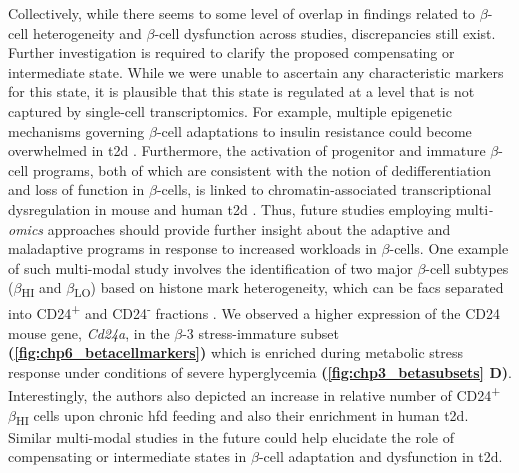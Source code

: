 \par Collectively, while there seems to some level of overlap in findings related to $\beta$-cell heterogeneity and $\beta$-cell dysfunction across studies, discrepancies still exist. Further investigation is required to clarify the proposed compensating or intermediate state. While we were unable to ascertain any characteristic markers for this state, it is plausible that this state is regulated at a level that is not captured by single-cell transcriptomics. For example, multiple epigenetic mechanisms governing  $\beta$-cell adaptations to insulin resistance could become overwhelmed in \gls{t2d} \textbf{\cite{kim_epigenetics_2020}}. Furthermore, the activation of progenitor and immature $\beta$-cell programs, both of which are consistent with the notion of dedifferentiation and loss of function in $\beta$-cells, is linked to chromatin-associated transcriptional dysregulation in mouse and human \gls{t2d} \textbf{\cite{lu_polycomb-dependent_2018}}. Thus, future studies employing multi\textit{-omics} approaches should provide further insight about the adaptive and maladaptive programs in response to increased workloads in $\beta$-cells. One example of such multi-modal study involves the identification of two major $\beta$-cell subtypes ($\beta$\textsubscript{HI} and $\beta$\textsubscript{LO}) based on histone mark heterogeneity, which can be \gls{facs} separated into CD24\textsuperscript{+} and CD24\textsuperscript{-} fractions \textbf{\cite{dror_epigenetic_2023}}. We observed a higher expression of the CD24 mouse gene, \textit{Cd24a}, in the $\beta$-3 stress-immature subset \textbf{(\autoref{fig:chp6_betacellmarkers})} which is enriched during metabolic stress response under conditions of severe hyperglycemia \textbf{(\autoref{fig:chp3_betasubsets} D)}. Interestingly, the authors also depicted an increase in relative number of CD24\textsuperscript{+} $\beta$\textsubscript{HI} cells upon chronic \gls{hfd} feeding and also their enrichment in human \gls{t2d}. Similar multi-modal studies in the future could help elucidate the role of compensating or intermediate states in $\beta$-cell adaptation and dysfunction in \gls{t2d}.\\ 

